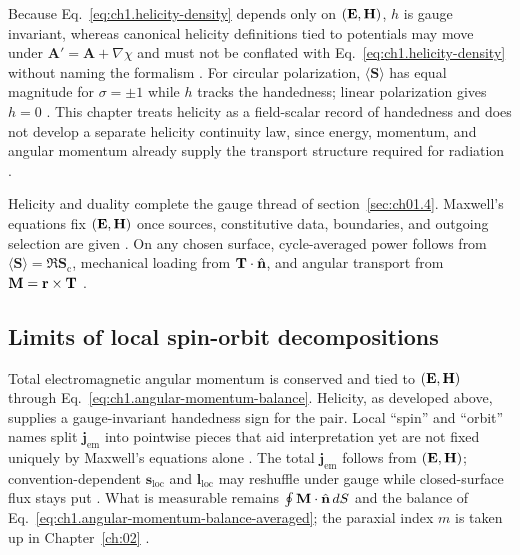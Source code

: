 Because Eq.~\eqref{eq:ch1.helicity-density} depends only on $(\mathbf{E},\mathbf{H})$, $h$ is gauge invariant, whereas canonical helicity definitions tied to potentials may move under $\mathbf{A}'=\mathbf{A}+\nabla\chi$ and must not be conflated with Eq.~\eqref{eq:ch1.helicity-density} without naming the formalism \cite{belinfante1940,tai1994,jackson1999}. For circular polarization, $\langle\mathbf{S}\rangle$ has equal magnitude for $\sigma=\pm1$ while $h$ tracks the handedness; linear polarization gives $h=0$ \cite{stratton1941}. This chapter treats helicity as a field-scalar record of handedness and does not develop a separate helicity continuity law, since energy, momentum, and angular momentum already supply the transport structure required for radiation \cite{stratton1941}.


Helicity and duality complete the gauge thread of section~\ref{sec:ch01.4}. Maxwell's equations fix $(\mathbf{E},\mathbf{H})$ once sources, constitutive data, boundaries, and outgoing selection are given \cite{maxwell1873,stratton1941}. On any chosen surface, cycle-averaged power follows from $\langle\mathbf{S}\rangle=\Re\mathbf{S}_\mathrm{c}$, mechanical loading from $\mathbf{T}\cdot\hat{\mathbf{n}}$, and angular transport from $\mathbf{M}=\mathbf{r}\times\mathbf{T}$ \cite{poynting1884,beth1936}.

\label{sec:ch01.4.4}
\subsection{Limits of local spin-orbit decompositions}
\label{sec:ch01.4.5}

Total electromagnetic angular momentum is conserved and tied to $(\mathbf{E},\mathbf{H})$ through Eq.~\eqref{eq:ch1.angular-momentum-balance}. Helicity, as developed above, supplies a gauge-invariant handedness sign for the pair. Local ``spin'' and ``orbit'' names split $\mathbf{j}_{\mathrm{em}}$ into pointwise pieces that aid interpretation yet are not fixed uniquely by Maxwell's equations alone \cite{belinfante1940,stratton1941}. The total $\mathbf{j}_{\mathrm{em}}$ follows from $(\mathbf{E},\mathbf{H})$; convention-dependent $\mathbf{s}_{\mathrm{loc}}$ and $\mathbf{l}_{\mathrm{loc}}$ may reshuffle under gauge while closed-surface flux stays put \cite{belinfante1940,stratton1941}. What is measurable remains $\oint \mathbf{M}\cdot\hat{\mathbf{n}}\,dS$ and the balance of Eq.~\eqref{eq:ch1.angular-momentum-balance-averaged}; the paraxial index $m$ is taken up in Chapter~\ref{ch:02} \cite{allen1992}.

